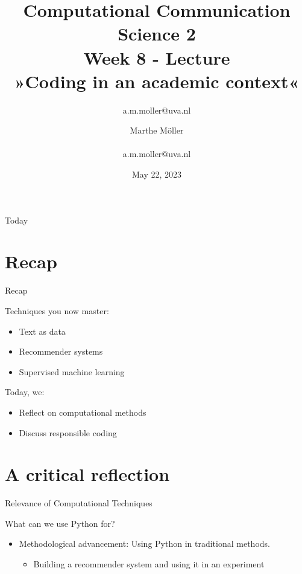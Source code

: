 \documentclass[compress]{beamer}
\title[Computational Communication Science 2]{\textbf{Computational Communication Science 2} \\Week 8 - Lecture\\ »Coding in an academic context«}
\author[Marthe Möller]{a.m.moller@uva.nl}\author[A. Marthe Möller]{Marthe Möller \\ ~ \\ \footnotesize{a.m.moller@uva.nl} \\}
\date{May 22, 2023}
\institute[Digital Society Minor, University of Amsterdam]{Digital Society Minor, University of Amsterdam}
\begin{document}
	
	\begin{frame}{}
		\titlepage
	\end{frame}
	
	\begin{frame}{Today}
		\begin{tiny}
			\tableofcontents
		\end{tiny}
	\end{frame}


\section{Recap}

\begin{frame}[fragile]{Recap} 
	
\begin{alertblock}{Techniques you now master:}
\begin{itemize}
	\item Text as data
	\item Recommender systems
	\item Supervised machine learning
\end{itemize}
\end{alertblock}

\begin{alertblock}{Today, we:}
\begin{itemize}
	\item Reflect on computational methods
	\item Discuss responsible coding
\end{itemize}
\end{alertblock}
\end{frame}


\section{A critical reflection}

\begin{frame}[fragile]{Relevance of Computational Techniques}
	
\begin{alertblock}{What can we use Python for?}	
\begin{itemize}
	\item Methodological advancement: Using Python in traditional methods. 
	\begin{itemize}
		\item Building a recommender system and using it in an experiment
	\end{itemize}
\end{itemize}
\end{alertblock}
\end{frame}
\end{document}
